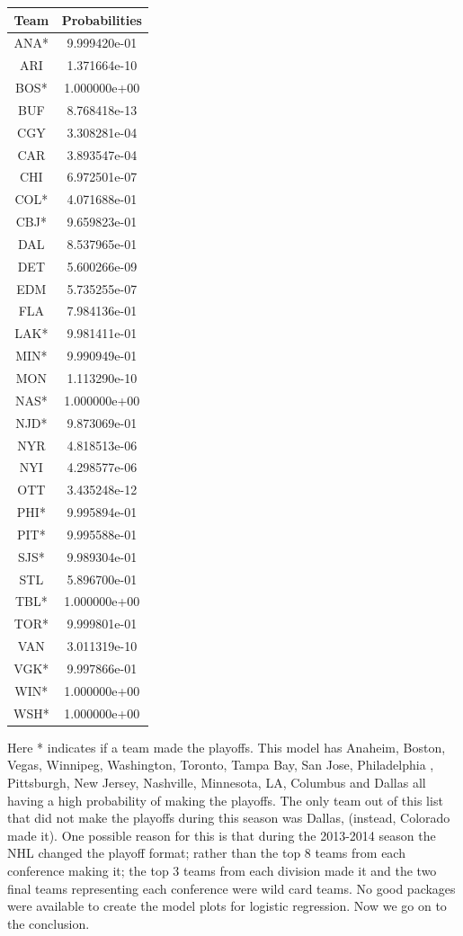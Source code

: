 \begin{longtable}{|c|c|}
	\hline
	Team & Probabilities \\
	\hline
ANA* & 9.999420e-01 \\
ARI & 1.371664e-10 \\
BOS* & 1.000000e+00 \\
BUF & 8.768418e-13 \\
CGY & 3.308281e-04 \\
CAR & 3.893547e-04 \\
CHI & 6.972501e-07 \\
COL* & 4.071688e-01 \\
CBJ* & 9.659823e-01 \\
DAL & 8.537965e-01 \\
DET & 5.600266e-09 \\
EDM & 5.735255e-07 \\
FLA & 7.984136e-01 \\
LAK* & 9.981411e-01 \\
MIN* & 9.990949e-01 \\
MON & 1.113290e-10 \\
NAS* & 1.000000e+00 \\
NJD* & 9.873069e-01 \\
NYR & 4.818513e-06 \\
NYI & 4.298577e-06 \\
OTT & 3.435248e-12 \\
\hline
PHI* & 9.995894e-01 \\
PIT* & 9.995588e-01 \\
SJS* & 9.989304e-01 \\
STL & 5.896700e-01 \\
TBL* & 1.000000e+00 \\
TOR* & 9.999801e-01 \\
VAN & 3.011319e-10 \\
VGK* & 9.997866e-01 \\
WIN* & 1.000000e+00 \\
WSH* & 1.000000e+00 \\
	\hline
\end{longtable}
Here * indicates if a team made the playoffs. This model has Anaheim, Boston, Vegas, Winnipeg, Washington, Toronto, Tampa Bay, San Jose, Philadelphia , Pittsburgh, New Jersey, Nashville, Minnesota, LA, Columbus and Dallas all having a high probability of making the playoffs. The only team out of this list that did not make the playoffs during this season was Dallas, (instead, Colorado made it). One possible reason for this is that during the 2013-2014 season the NHL changed the playoff format; rather than the top 8 teams from each conference making it; the top 3 teams from each division made it and the two final teams representing each conference were wild card teams. No good packages were available to create the model plots for logistic regression. Now we go on to the conclusion.